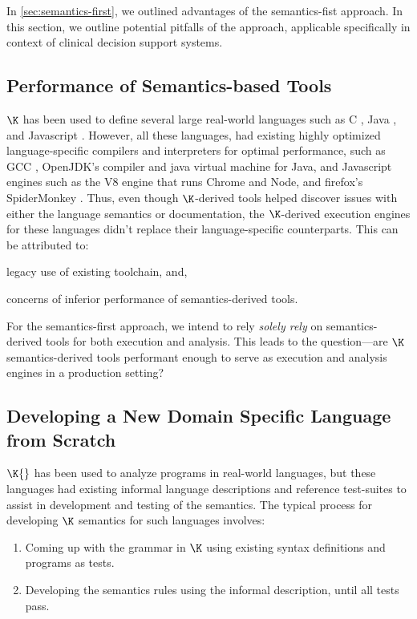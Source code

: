 In \autoref{sec:semantics-first}, we outlined advantages of the
semantics-fist approach.
In this section, we outline potential pitfalls of the
approach, applicable specifically in context of clinical decision support
systems.

\subsection{Performance of Semantics-based Tools}

$\K$ has been used to define several large real-world languages such as C
\cite{HathhornPLDI15}, Java \cite{BogdanasPOPL15}, and Javascript
\cite{ParkPLDI15}. However, all these languages, had existing
highly optimized language-specific compilers and interpreters
for optimal performance, such as GCC \cite{GCCUrl}, OpenJDK's compiler and java
virtual machine for Java, and Javascript engines such as the V8 engine
\cite{V8Url} that runs Chrome and Node, and firefox's SpiderMonkey
\cite{SpiderMonkeyUrl}. Thus, even though $\K$-derived tools helped
discover issues with either the language semantics or documentation,
the $\K$-derived execution engines for these languages didn't
replace their language-specific counterparts. This can be attributed to:
\begin{enumerate*}[label=(\roman*)]
  \item legacy use of existing toolchain, and,
  \item concerns of inferior performance of semantics-derived tools.
\end{enumerate*}

For the semantics-first approach, we intend to rely \emph{solely rely} on
semantics-derived tools for both execution and analysis. This leads to the
question---are $\K$ semantics-derived tools performant enough to serve as
execution and analysis engines in a production setting?

\subsection{Developing a New Domain Specific Language from Scratch}

$\K{}$ has been used to analyze programs in real-world languages, but
these languages had existing informal language descriptions
and reference test-suites to assist in development and testing of
the semantics. The typical process for developing $\K$ semantics for
such languages involves:
\begin{enumerate}[label=(\roman*)]
  \item Coming up with the grammar in $\K$ using existing syntax
    definitions and programs as tests.
  \item Developing the semantics rules using the informal description,
    until all tests pass.
\end{enumerate}

